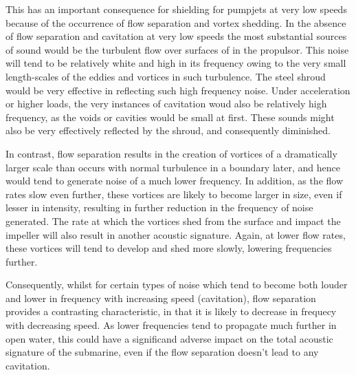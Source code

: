 \documentclass{article}\usepackage[]{graphicx}\usepackage[]{color}
\begin{document}
This has an important consequence for shielding for pumpjets at very low speeds because of the occurrence of flow separation and vortex shedding. In the absence of flow separation and cavitation at very low speeds the most substantial sources of sound would be the turbulent flow over surfaces of in the propulsor.  This noise will tend to be relatively white and high in its frequency owing to the very small length-scales of the eddies and vortices in such turbulence.  The steel shroud would be very effective in reflecting such high frequency noise.  Under acceleration or higher loads, the very instances of cavitation woud also be relatively high frequency, as the voids or cavities would be small at first. These sounds might also be very effectively reflected by the shroud, and consequently diminished.

In contrast, flow separation results in the creation of vortices of a dramatically larger scale than occurs with normal turbulence in a boundary later, and hence would tend to generate noise of a much lower frequency.  In addition, as the flow rates slow even further, these vortices are likely to become larger in size, even if lesser in intensity, resulting in further reduction in the frequency of noise generated.  The rate at which the vortices shed from the surface and impact the impeller will also result in another acoustic signature.  Again, at lower flow rates, these vortices will tend to develop and shed more slowly, lowering frequencies further.

Consequently, whilst for certain types of noise which tend to become both louder and lower in frequency with increasing speed (cavitation), flow separation provides a contrasting characteristic, in that it is likely to decrease in frequecy with decreasing speed.  As lower frequencies tend to propagate much further in open water, this could have a significand adverse impact on the total acoustic signature of the submarine, even if the flow separation doesn't lead to any cavitation.
\end{document}
